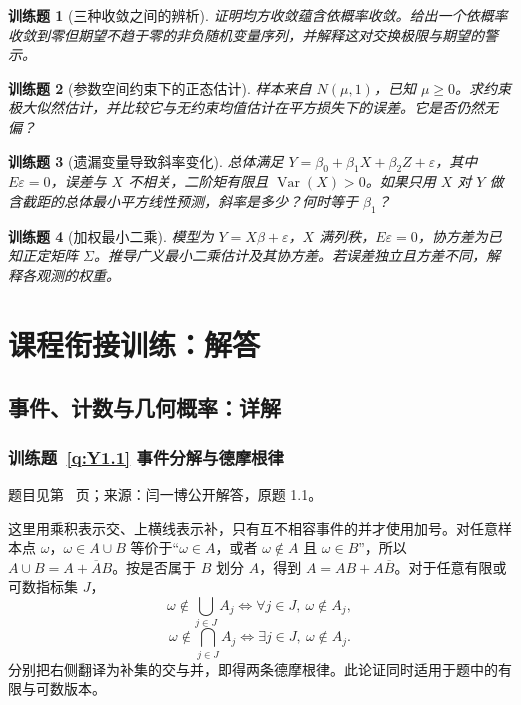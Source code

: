 \documentclass[UTF8,12pt,a4paper,fontset=fandol]{ctexbook}
\newtheorem{exercise}{训练题}[section]
\begin{document}
\begin{exercise}[三种收敛之间的辨析]\label{q:B17.21}
证明均方收敛蕴含依概率收敛。给出一个依概率收敛到零但期望不趋于零的非负随机变量序列，并解释这对交换极限与期望的警示。\par{}\end{exercise}

\begin{exercise}[参数空间约束下的正态估计]\label{q:B17.22}
样本来自 $N(\mu,1)$，已知 $\mu\ge0$。求约束极大似然估计，并比较它与无约束均值估计在平方损失下的误差。它是否仍然无偏？\par{}\end{exercise}

\begin{exercise}[遗漏变量导致斜率变化]\label{q:B17.23}
总体满足 $Y=\beta_0+\beta_1X+\beta_2Z+\varepsilon$，其中 $E\varepsilon=0$，误差与 $X$ 不相关，二阶矩有限且 $\operatorname{Var}(X)>0$。如果只用 $X$ 对 $Y$ 做含截距的总体最小平方线性预测，斜率是多少？何时等于 $\beta_1$？\par{}\end{exercise}

\begin{exercise}[加权最小二乘]\label{q:B17.24}
模型为 $Y=X\beta+\varepsilon$，$X$ 满列秩，$E\varepsilon=0$，协方差为已知正定矩阵 $\Sigma$。推导广义最小二乘估计及其协方差。若误差独立且方差不同，解释各观测的权重。\par{}\end{exercise}

\clearpage\chapter{课程衔接训练：解答}

\clearpage\section*{事件、计数与几何概率：详解}

\subsection*{训练题~\ref{q:Y1.1} 事件分解与德摩根律}\label{a:Y1.1}{\small 题目见第~\pageref{q:Y1.1} 页；来源：闫一博公开解答，原题 1.1。}
\begin{solve}这里用乘积表示交、上横线表示补，只有互不相容事件的并才使用加号。对任意样本点 $\omega$，$\omega\in A\cup B$ 等价于“$\omega\in A$，或者 $\omega\notin A$ 且 $\omega\in B$”，所以 $A\cup B=A+\overline AB$。按是否属于 $B$ 划分 $A$，得到 $A=AB+A\overline B$。对于任意有限或可数指标集 $J$，\[\omega\notin\bigcup_{j\in J}A_j\iff\forall j\in J,\ \omega\notin A_j,\]\[\omega\notin\bigcap_{j\in J}A_j\iff\exists j\in J,\ \omega\notin A_j.\]分别把右侧翻译为补集的交与并，即得两条德摩根律。此论证同时适用于题中的有限与可数版本。\end{solve}
\end{document}
